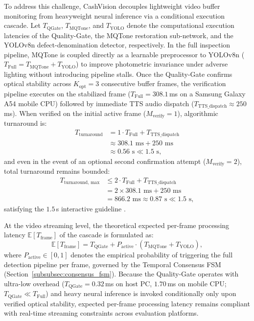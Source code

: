 \documentclass[final,5p,times,twocolumn,authoryear]{elsarticle}
\begin{document}
To address this challenge, CashVision decouples lightweight video buffer monitoring from heavyweight neural inference via a conditional execution cascade. Let $T_{\text{QGate}}$, $T_{\text{MQTone}}$, and $T_{\text{YOLO}}$ denote the computational execution latencies of the Quality-Gate, the MQTone restoration sub-network, and the YOLOv8n defect-denomination detector, respectively. In the full inspection pipeline, MQTone is coupled directly as a learnable preprocessor to YOLOv8n ($T_{\text{Full}} = T_{\text{MQTone}} + T_{\text{YOLO}}$) to improve photometric invariance under adverse lighting without introducing pipeline stalls. Once the Quality-Gate confirms optical stability across $K_{\text{opt}} = 3$ consecutive buffer frames, the verification pipeline executes on the stabilized frame ($T_{\text{Full}} = 308.1$\,ms on a Samsung Galaxy A54 mobile CPU) followed by immediate TTS audio dispatch ($T_{\text{TTS\_dispatch}} \approx 250$\,ms). When verified on the initial active frame ($M_{\text{verify}} = 1$), algorithmic turnaround is:
\begin{equation}
\begin{aligned}
T_{\text{turnaround}}
&= 1 \cdot T_{\text{Full}} + T_{\text{TTS\_dispatch}} \\
&\approx 308.1\text{ ms} + 250\text{ ms} \\
&\approx 0.56\text{ s} \ll 1.5\text{ s},
\end{aligned}
\label{eq:turnaround_latency}
\end{equation}
and even in the event of an optional second confirmation attempt ($M_{\text{verify}} = 2$), total turnaround remains bounded:
\begin{equation}
\begin{aligned}
T_{\text{turnaround, max}}
&\le 2 \cdot T_{\text{Full}} + T_{\text{TTS\_dispatch}} \\
&= 2 \times 308.1\text{ ms} + 250\text{ ms} \\
&= 866.2\text{ ms} \approx 0.87\text{ s} \ll 1.5\text{ s},
\end{aligned}
\label{eq:turnaround_latency_max}
\end{equation}
satisfying the $1.5$\,s interactive guideline \cite{Nielsen1993}.

At the video streaming level, the theoretical expected per-frame processing latency $\mathbb{E}[T_{\text{frame}}]$ of the cascade is formulated as:
\begin{equation}
\mathbb{E}[T_{\text{frame}}] = T_{\text{QGate}} + P_{\text{active}} \cdot \left( T_{\text{MQTone}} + T_{\text{YOLO}} \right),
\label{eq:cascade_latency}
\end{equation}
where $P_{\text{active}} \in [0, 1]$ denotes the empirical probability of triggering the full detection pipeline per frame, governed by the Temporal Consensus FSM (Section~\ref{subsubsec:consensus_fsm}). Because the Quality-Gate operates with ultra-low overhead ($T_{\text{QGate}} = 0.32$\,ms on host PC, $1.70$\,ms on mobile CPU; $T_{\text{QGate}} \ll T_{\text{Full}}$) and heavy neural inference is invoked conditionally only upon verified optical stability, expected per-frame processing latency remains compliant with real-time streaming constraints across evaluation platforms.
\end{document}
